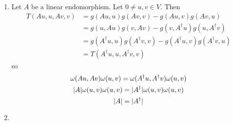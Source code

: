 \documentclass[a4paper, 12pt]{article}
\DeclarePairedDelimiter\abs{\lvert}{\rvert}
\begin{document}
\begin{enumerate}
\begin{enumerate}
\item Let \(A\) be a linear endomorphism. Let \(0\neq u,v\in V\). Then
\begin{align*}
T(Au,u,Av,v)&=g(Au,u)g(Av,v)-g(Au,v)g(Av,u)\\
&=g(u,Au)g(v,Av)-g(v,A^\dag u)g(u,A^\dag v)\\
&=g(A^\dag u,u)g(A^\dag v,v)-g(A^\dag u,v)g(A^\dag v,u)\\
&=T(A^\dag u,u,A^\dag v,v)
\end{align*}
so
\begin{gather*}
\omega(Au,Av)\omega(u,v)=\omega(A^\dag u,A^\dag v)\omega(u,v)\\
\abs{A}\omega(u,v)\omega(u,v)=\abs{A^\dag}\omega(u,v)\omega(u,v)\\
\abs{A}=\abs{A^\dag}
\end{gather*}

\item

\end{enumerate}

\end{enumerate}
\end{document}
